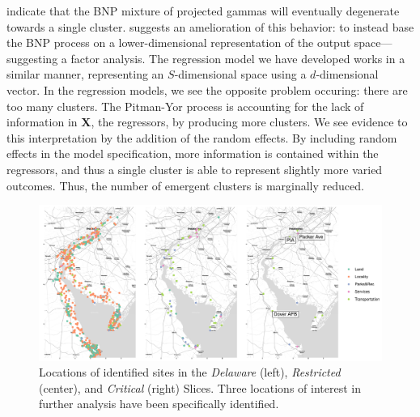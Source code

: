     indicate that the BNP mixture of projected gammas will eventually degenerate towards a 
    single cluster.
    \cite{chandra2023} suggests an amelioration of this behavior: to instead base the 
    BNP process on a lower-dimensional representation of the output space---suggesting 
    a factor analysis.  The regression model we have developed works in a similar manner, 
    representing an $S$-dimensional space using a $d$-dimensional vector.  In the regression
    models, we see the opposite problem occuring: there are too many clusters.  The Pitman-Yor
    process is accounting for the lack of information in $\bm{X}$, the regressors, by producing
    more clusters.  We see evidence to this interpretation by the addition of the random 
    effects.  By including random effects in the model specification, more information is 
    contained within the regressors, and thus a single cluster is able to represent slightly 
    more varied outcomes.  Thus, the number of emergent clusters is marginally reduced.

\begin{figure}[ht]
    \centering
    \includegraphics[width=0.99\linewidth]{./plots/delaware}
    \caption{Locations of identified sites in the \emph{Delaware} (left), 
    \emph{Restricted} (center), and \emph{Critical} (right) Slices.  
    Three locations of interest in further analysis have been specifically identified.
    \label{map:delawarebay}}
\end{figure}

